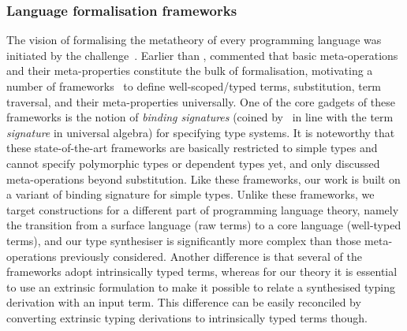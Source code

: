 

\subsubsection{Language formalisation frameworks}
\label{sec:language-formalisation}

The vision of formalising the metatheory of every programming language was initiated by the \PoplMark challenge~\citep{Aydemir2005}.
Earlier than \PoplMark, \citet{Altenkirch1993} commented that basic meta-operations and their meta-properties constitute the bulk of formalisation, motivating a number of frameworks~\citep{Ahrens2018,Fiore2022,Gheri2020,Ahrens2022,Allais2021} to define well-scoped/typed terms, substitution, term traversal, and their meta-properties universally.
One of the core gadgets of these frameworks is the notion of \emph{binding signatures} (coined by~\citet{Aczel1978} in line with the term \emph{signature} in universal algebra) for specifying type systems.
It is noteworthy that these state-of-the-art frameworks are basically restricted to simple types%
and cannot specify polymorphic types or dependent types yet, and only \citeauthor{Allais2021} discussed meta-operations beyond substitution.
Like these frameworks, our work is  built on a variant of binding signature for simple types.
Unlike these frameworks, we target constructions for a different part of programming language theory, namely the transition from a surface language (raw terms) to a core language (well-typed terms), and our type synthesiser is significantly more complex than those meta-operations previously considered.
Another difference is that several of the frameworks%
adopt intrinsically typed terms, whereas for our theory it is essential to use an extrinsic formulation to make it possible to relate a synthesised typing derivation with an input term.
This difference can be easily reconciled by converting extrinsic typing derivations to intrinsically typed terms though.

